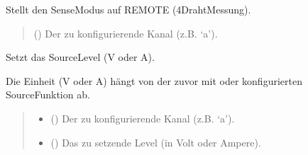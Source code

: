 \documentclass[letterpaper,10pt,english]{sphinxmanual}
\begin{document}
\begin{fulllineitems}
\begin{fulllineitems}
\label{\detokenize{modulab/smu_manager:modules.smu.SmuManager.SmuManager.set_sense_remote}}
\pysigstartsignatures
\pysiglinewithargsret
{}
{}
{}
\pysigstopsignatures
\sphinxAtStartPar
Stellt den Sense\sphinxhyphen{}Modus auf REMOTE (4\sphinxhyphen{}Draht\sphinxhyphen{}Messung).
\begin{quote}\begin{description}
\sphinxAtStartPar
{} () \textendash{} Der zu konfigurierende Kanal (z.B. ‘a’).

\end{description}\end{quote}

\end{fulllineitems}


\begin{fulllineitems}
\label{\detokenize{modulab/smu_manager:modules.smu.SmuManager.SmuManager.set_source_level}}
\pysigstartsignatures
\pysiglinewithargsret
{}
{\sphinxparamcomma {}}
{}
\pysigstopsignatures
\sphinxAtStartPar
Setzt das Source\sphinxhyphen{}Level (V oder A).

\sphinxAtStartPar
Die Einheit (V oder A) hängt von der zuvor mit 
oder  konfigurierten Source\sphinxhyphen{}Funktion ab.
\begin{quote}\begin{description}
\begin{itemize}
\item {} 
\sphinxAtStartPar
{} () \textendash{} Der zu konfigurierende Kanal (z.B. ‘a’).

\item {} 
\sphinxAtStartPar
{} () \textendash{} Das zu setzende Level (in Volt oder Ampere).


\end{itemize}
\end{description}
\end{quote}
\end{fulllineitems}
\end{fulllineitems}
\end{document}
